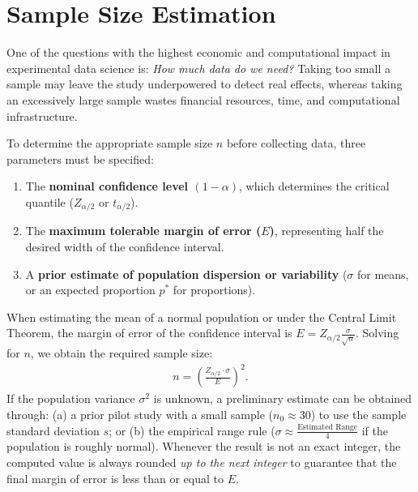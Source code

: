 \section{Sample Size Estimation}

One of the questions with the highest economic and computational impact in experimental data science is: \emph{How much data do we need?} Taking too small a sample may leave the study underpowered to detect real effects, whereas taking an excessively large sample wastes financial resources, time, and computational infrastructure.

To determine the appropriate sample size $n$ before collecting data, three parameters must be specified:
\begin{enumerate}
	\item The \textbf{nominal confidence level $(1-\alpha)$}, which determines the critical quantile ($Z_{\alpha/2}$ or $t_{\alpha/2}$).
	\item The \textbf{maximum tolerable margin of error ($E$)}, representing half the desired width of the confidence interval.
	\item A \textbf{prior estimate of population dispersion or variability} ($\sigma$ for means, or an expected proportion $p^*$ for proportions).
\end{enumerate}

\begin{teorema}
	When estimating the mean of a normal population or under the Central Limit Theorem, the margin of error of the confidence interval is $E = Z_{\alpha/2} \frac{\sigma}{\sqrt{n}}$. Solving for $n$, we obtain the required sample size:
	\begin{align}
		n = \left( \frac{Z_{\alpha/2} \cdot \sigma}{E} \right)^2.
		\label{eq:n_media}
	\end{align}
	If the population variance $\sigma^2$ is unknown, a preliminary estimate can be obtained through: (a) a prior pilot study with a small sample ($n_0 \approx 30$) to use the sample standard deviation $s$; or (b) the empirical range rule ($\sigma \approx \frac{\text{Estimated Range}}{4}$ if the population is roughly normal). Whenever the result is not an exact integer, the computed value is always rounded \emph{up to the next integer} to guarantee that the final margin of error is less than or equal to $E$.
\end{teorema}

